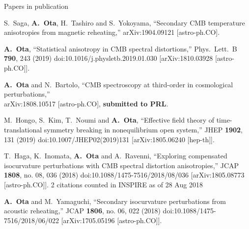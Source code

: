 \documentclass[a4paper]{resume} %
\begin{document}
\begin{rSection}{Papers in publication}


\begin{etaremune}


\item
  S.~Saga, {\bf A.~Ota}, H.~Tashiro and S.~Yokoyama,
  ``Secondary CMB temperature anisotropies from magnetic reheating,''
  arXiv:1904.09121 [astro-ph.CO].



\item  
  {\bf A.~Ota},
  ``Statistical anisotropy in CMB spectral distortions,''
  Phys.\ Lett.\ B {\bf 790}, 243 (2019)
  doi:10.1016/j.physletb.2019.01.030
  [arXiv:1810.03928 [astro-ph.CO]].
  

\item
  {\bf A.~Ota} and N.~Bartolo,
  ``CMB spectroscopy at third-order in cosmological perturbations,''\\
  arXiv:1808.10517 [astro-ph.CO], {\bf submitted to PRL}.
    \item 
      M.~Hongo, S.~Kim, T.~Noumi and {\bf A.~Ota},
  ``Effective field theory of time-translational symmetry breaking in nonequilibrium open system,''
  JHEP {\bf 1902}, 131 (2019)
  doi:10.1007/JHEP02(2019)131
  [arXiv:1805.06240 [hep-th]].



\item
  T.~Haga, K.~Inomata, {\bf A.~Ota} and A.~Ravenni,
  ``Exploring compensated isocurvature perturbations with CMB spectral distortion anisotropies,''
  JCAP {\bf 1808}, no. 08, 036 (2018)
  doi:10.1088/1475-7516/2018/08/036
  [arXiv:1805.08773 [astro-ph.CO]].
  2 citations counted in INSPIRE as of 28 Aug 2018
  
    \item 
  {\bf A.~Ota} and M.~Yamaguchi,
  ``Secondary isocurvature perturbations from acoustic reheating,''
  JCAP {\bf 1806}, no. 06, 022 (2018)
  doi:10.1088/1475-7516/2018/06/022
  [arXiv:1705.05196 [astro-ph.CO]].
  

\end{etaremune}
\end{rSection}
\end{document}
